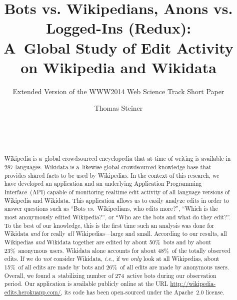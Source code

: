 \documentclass{sig-alternate}
\newcommand{\inlinelistingsize}{\fontsize{8pt}{11pt}}
\let\oldurl\url
\renewcommand{\url}[1]{\inlinelistingsize\oldurl{#1}}
\begin{document}
%

\title{Bots vs. Wikipedians, Anons vs. Logged-Ins (Redux):\\ A~Global Study of Edit Activity on Wikipedia and Wikidata}

\subtitle{Extended Version of the WWW2014 Web Science Track Short Paper}


\author{
\alignauthor
Thomas Steiner\\
       \\
       \\
       \\
}

\maketitle
\begin{abstract}
Wikipedia is a~global crowdsourced encyclopedia
that at time of writing is available in 287 languages.
Wikidata is a~likewise global crowdsourced knowledge base
that provides shared facts to be used by Wikipedias.
In the context of this research, we have developed
an application and an underlying
Application Programming Interface~(API) capable of monitoring
realtime edit activity of all language versions
of Wikipedia and Wikidata.
This application allows us to easily analyze edits
in order to answer questions such as
``Bots \emph{vs.}\ Wikipedians, who edits more?'',
``Which is the most anonymously edited Wikipedia?'',
or ``Who are the bots and what do they edit?''.
To the best of our knowledge,
this is the first time such an analysis
was done for Wikidata \emph{and}
for really \emph{all} Wikipedias---large and small.
According to our results, all Wikipedias \emph{and} Wikidata together
are edited by about 50\%~bots and by about 23\%~anonymous users.
Wikidata alone accounts for about 48\%~of the totally observed edits.
If we do \emph{not} consider Wikidata, \emph{i.e.},
if we \emph{only} look at all Wikipedias,
about 15\%~of all edits are made by bots
and 26\%~of all edits are made by anonymous users.
Overall, we found a~stabilizing number of 274~active bots
during our observation period.
Our application is available publicly online at the URL
\url{http://wikipedia-edits.herokuapp.com/},
its code has been open-sourced under the Apache~2.0 license.
\end{abstract}
\end{document}
